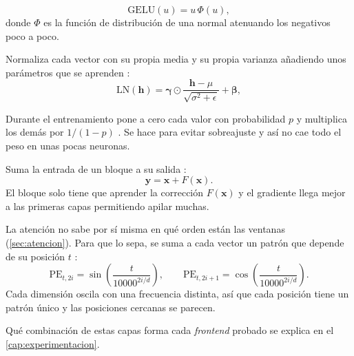 \begin{description}
  \begin{equation}
    \mathrm{GELU}(u) = u\,\Phi(u),
    \label{eq:gelu}
  \end{equation}
  donde $\Phi$ es la función de distribución de una normal atenuando los negativos poco a poco.

  \item[Normalización por capas (\textit{LayerNorm}).] Normaliza cada vector con su propia media y su propia varianza añadiendo unos parámetros que se aprenden \cite{ba2016layernorm}:
  \begin{equation}
    \mathrm{LN}(\mathbf{h}) = \boldsymbol{\gamma} \odot \frac{\mathbf{h} - \mu}{\sqrt{\sigma^2 + \epsilon}} + \boldsymbol{\beta},
    \label{eq:layernorm}
  \end{equation}

  \item[\textit{Dropout}.] Durante el entrenamiento pone a cero cada valor con probabilidad $p$ y multiplica los demás por $1/(1-p)$ \cite{srivastava2014dropout}. Se hace para evitar sobreajuste y así no cae todo el peso en unas pocas neuronas.

  \item[Conexión residual.] Suma la entrada de un bloque a su salida \cite{he2016resnet}:
  \begin{equation}
    \mathbf{y} = \mathbf{x} + F(\mathbf{x}).
    \label{eq:residual}
  \end{equation}
  El bloque solo tiene que aprender la corrección $F(\mathbf{x})$ y el gradiente llega mejor a las primeras capas permitiendo apilar muchas.

  \item[Codificación posicional.] La atención no sabe por sí misma en qué orden están las ventanas (\cref{sec:atencion}). Para que lo sepa, se suma a cada vector un patrón que depende de su posición $t$ \cite{vaswani2017attention}:
  \begin{equation}
    \mathrm{PE}_{t,2i} = \sin\!\left( \frac{t}{10000^{2i/d}} \right), \qquad \mathrm{PE}_{t,2i+1} = \cos\!\left( \frac{t}{10000^{2i/d}} \right).
    \label{eq:posicional}
  \end{equation}
  Cada dimensión oscila con una frecuencia distinta, así que cada posición tiene un patrón único y las posiciones cercanas se parecen.
\end{description}

Qué combinación de estas capas forma cada \textit{frontend} probado se explica en el \cref{cap:experimentacion}.

